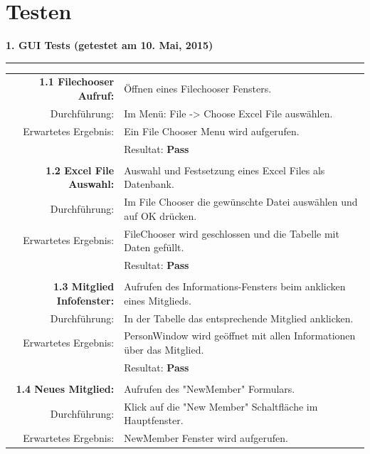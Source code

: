 \documentclass{article}
\begin{document}
\section{Testen}
\textbf{1. GUI Tests (getestet am 10. Mai, 2015)\\}
\rule[2mm]{1\linewidth}{0.3mm}
\begin{tabular}{r|p{12cm}}
	\textbf{1.1 Filechooser Aufruf:} & Öffnen eines Filechooser Fensters.\\
		Durchführung:			& Im Menü: File -> Choose Excel File auswählen.	\\			
		Erwartetes Ergebnis: 	& Ein File Chooser Menu wird aufgerufen. \\
								& Resultat:  \textbf{Pass}\hspace{8.4cm} \color{green} {\ding{51}} \\
		\\
	\textbf{1.2 Excel File Auswahl:} & Auswahl und Festsetzung eines Excel Files als Datenbank.\\
		Durchführung:			& 	Im File Chooser die gewünschte Datei auswählen und auf OK 		drücken.\\
		Erwartetes Ergebnis: 	&	FileChooser wird geschlossen und die Tabelle mit Daten gefüllt. \\
								& Resultat:  \textbf{Pass}\hspace{8.4cm} \color{green} {\ding{51}} \\
	\\
	\textbf{1.3 Mitglied Infofenster:} & Aufrufen des Informations-Fensters beim anklicken eines Mitglieds. \\
		Durchführung:			& In der Tabelle das entsprechende Mitglied anklicken. \\
		Erwartetes Ergebnis: 	& PersonWindow wird geöffnet mit allen Informationen über das Mitglied.\\
								& Resultat:  \textbf{Pass}\hspace{8.4cm} \color{green} {\ding{51}} \\
							\\
	\textbf{1.4 Neues Mitglied:} & Aufrufen des "NewMember" Formulars. \\
		Durchführung:			& Klick auf die "New Member" Schaltfläche im Hauptfenster.\\
		Erwartetes Ergebnis: 	& NewMember Fenster wird aufgerufen. \\

\end{tabular}
\end{document}
